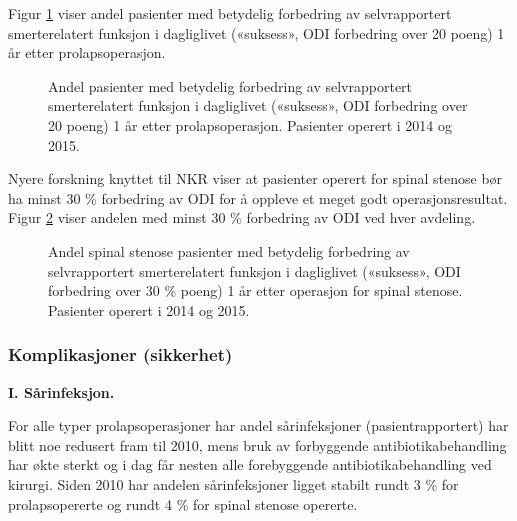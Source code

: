 Figur \ref{fig:OswEndr20} viser andel pasienter med betydelig forbedring av selvrapportert
smerterelatert funksjon i dagliglivet («suksess», ODI forbedring over 20 poeng) 1 år
etter prolapsoperasjon.

\begin{figure}[ht]
\caption{\label{fig:OswEndr20}   Andel pasienter med betydelig forbedring av selvrapportert
smerterelatert funksjon i dagliglivet («suksess», ODI forbedring over 20 poeng) 1 år
etter prolapsoperasjon. Pasienter operert i 2014 og 2015.}
\end{figure}



Nyere forskning knyttet til NKR viser at pasienter operert for spinal stenose bør ha minst 30 \% forbedring av ODI for å oppleve et meget godt operasjonsresultat. Figur \ref{fig:OswEndr30pstSS} viser andelen med minst 30 \% forbedring av ODI ved hver avdeling.

\begin{figure}[ht]
\caption{\label{fig:OswEndr30pstSS} Andel spinal stenose pasienter med betydelig forbedring av selvrapportert
smerterelatert funksjon i dagliglivet («suksess», ODI forbedring over 30 \% poeng) 1 år
etter operasjon for spinal stenose. Pasienter operert i 2014 og 2015.}
\end{figure}













\subsubsection{Komplikasjoner (sikkerhet)}

\textbf{I. Sårinfeksjon.}

For alle typer prolapsoperasjoner har
andel sårinfeksjoner (pasientrapportert) har blitt noe redusert fram til 2010, mens bruk av  forbyggende antibiotikabehandling har økte sterkt og i dag får nesten alle forebyggende antibiotikabehandling ved kirurgi. Siden 2010 har andelen sårinfeksjoner ligget stabilt rundt 3 \% for prolapsopererte og rundt 4 \% for spinal stenose opererte.



